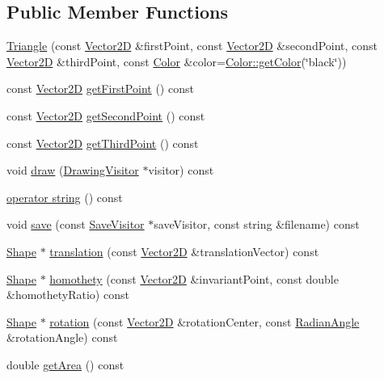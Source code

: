 \subsection*{Public Member Functions}
\begin{DoxyCompactItemize}
\item 
\hyperlink{class_triangle_ab74304b451a87d4c72ece2fe442ca0a7}{Triangle} (const \hyperlink{class_vector2_d}{Vector2D} \&first\+Point, const \hyperlink{class_vector2_d}{Vector2D} \&second\+Point, const \hyperlink{class_vector2_d}{Vector2D} \&third\+Point, const \hyperlink{class_color}{Color} \&color=\hyperlink{class_color_a94697e8c9eb81124c5a7c1439e1e7348}{Color\+::get\+Color}(\char`\"{}black\char`\"{}))
\item 
const \hyperlink{class_vector2_d}{Vector2D} \hyperlink{class_triangle_aa40afc17cb09bf78a863b2e93e5cff45}{get\+First\+Point} () const
\item 
const \hyperlink{class_vector2_d}{Vector2D} \hyperlink{class_triangle_aa92252309b0e6d9ce26a1c9679b7cf19}{get\+Second\+Point} () const
\item 
const \hyperlink{class_vector2_d}{Vector2D} \hyperlink{class_triangle_aa44238e4272fe5a2b9e83974f58f95c6}{get\+Third\+Point} () const
\item 
void \hyperlink{class_triangle_a1fa834143ed718605959a227eba573b3}{draw} (\hyperlink{class_drawing_visitor}{Drawing\+Visitor} $\ast$visitor) const
\item 
\hyperlink{class_triangle_acd8612cc20ffb71e543944c869e4ab81}{operator string} () const
\item 
void \hyperlink{class_triangle_ae9ac3d633172f14d391d290a4467e1d3}{save} (const \hyperlink{class_save_visitor}{Save\+Visitor} $\ast$save\+Visitor, const string \&filename) const
\item 
\hyperlink{class_shape}{Shape} $\ast$ \hyperlink{class_triangle_ac66208b0b633add41b915860f051cf44}{translation} (const \hyperlink{class_vector2_d}{Vector2D} \&translation\+Vector) const
\item 
\hyperlink{class_shape}{Shape} $\ast$ \hyperlink{class_triangle_a45a3a9f74118c99b95c6d8e993773a71}{homothety} (const \hyperlink{class_vector2_d}{Vector2D} \&invariant\+Point, const double \&homothety\+Ratio) const
\item 
\hyperlink{class_shape}{Shape} $\ast$ \hyperlink{class_triangle_a663ca3c6bd7967265849bf1f8c8a464b}{rotation} (const \hyperlink{class_vector2_d}{Vector2D} \&rotation\+Center, const \hyperlink{class_radian_angle}{Radian\+Angle} \&rotation\+Angle) const
\item 
double \hyperlink{class_triangle_a5f7fa9fd678345063e50e3458d943a9b}{get\+Area} () const
\end{DoxyCompactItemize}

